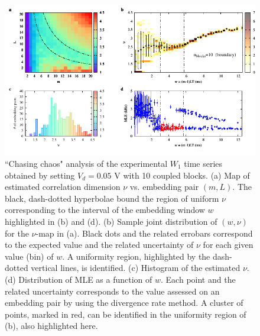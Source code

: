 \begin{figure}[H]
    \centering
    \includegraphics[width=\linewidth]{../blocks/10_blocks/2e5_points/plots/chaos_low.pdf}
    \caption{``Chasing chaos" analysis of the experimental $W_1$ time series obtained by setting $V_d=0.05$ V with 10 coupled blocks.
    (a) Map of estimated correlation dimension $\nu$ vs. embedding pair $(m, L)$.
    The black, dash-dotted hyperbolae bound the region of uniform $\nu$ corresponding to the interval of the
    embedding window $w$ highlighted in (b) and (d).
    (b) Sample joint distribution of $(w,\nu)$ for the $\nu$-map in (a).
    Black dots and the related errobars correspond to the expected value and the related uncertainty of $\nu$
    for each given value (bin) of $w$. A uniformity region, highlighted by the dash-dotted vertical lines,
    is identified. (c) Histogram of the estimated $\nu$. (d) Distribution of MLE as a function of $w$. Each point and the related
    uncertainty corresponds to the value assessed on an embedding pair by using the divergence rate method.
    A cluster of points, marked in red, can be identified in the uniformity region of (b), also highlighted here.}
    \label{fig:10 blocks chaos}
\end{figure}


